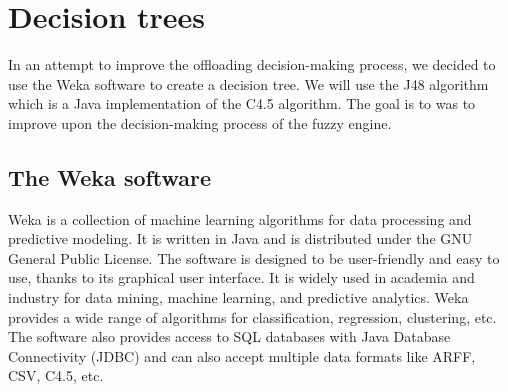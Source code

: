 \begin{table}[H]
	\bigskip

	\centering
	\caption{Sample results from the fuzzy engine with the Bounded sum aggregation operator.}
	\label{tab:fuzzy-results-bounded}
\end{table}

\chapter{Decision trees}
\label{chap:decision-trees}

In an attempt to improve the offloading decision-making process, we decided to use the Weka\cite{weka} software to create
a decision tree. We will use the J48 algorithm which is a Java implementation of the C4.5 algorithm. The goal is to was to
improve upon the decision-making process of the fuzzy engine.

\section{The Weka software}
\label{sec:weka}

Weka is a collection of machine learning algorithms for data processing and predictive modeling. It is written in Java and
is distributed under the GNU General Public License. The software is designed to be user-friendly and easy to use, thanks
to its graphical user interface. It is widely used in academia and industry for data mining, machine learning, and predictive
analytics. Weka provides a wide range of algorithms for classification, regression, clustering, etc. The software also
provides access to SQL databases with Java Database Connectivity (JDBC) and can also accept multiple data formats like
ARFF, CSV, C4.5, etc.

